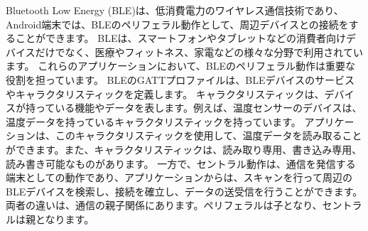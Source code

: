 




Bluetooth Low Energy (BLE)は、低消費電力のワイヤレス通信技術であり、Android端末では、BLEのペリフェラル動作として、周辺デバイスとの接続をすることができます。
 BLEは、スマートフォンやタブレットなどの消費者向けデバイスだけでなく、医療やフィットネス、家電などの様々な分野で利用されています。
 これらのアプリケーションにおいて、BLEのペリフェラル動作は重要な役割を担っています。
BLEのGATTプロファイルは、BLEデバイスのサービスやキャラクタリスティックを定義します。
キャラクタリスティックは、デバイスが持っている機能やデータを表します。例えば、温度センサーのデバイスは、温度データを持っているキャラクタリスティックを持っています。
アプリケーションは、このキャラクタリスティックを使用して、温度データを読み取ることができます。また、キャラクタリスティックは、読み取り専用、書き込み専用、読み書き可能なものがあります。
一方で、セントラル動作は、通信を発信する端末としての動作であり、アプリケーションからは、スキャンを行って周辺のBLEデバイスを検索し、接続を確立し、データの送受信を行うことができます。
両者の違いは、通信の親子関係にあります。ペリフェラルは子となり、セントラルは親となります。


